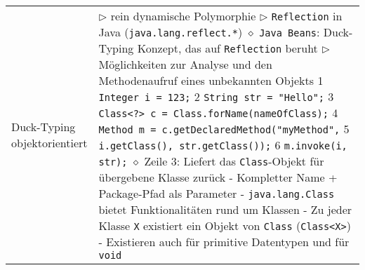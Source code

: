 \begin{longtable}{ | p{} p{} | }
	\makecell[l]{Duck-Typing \\ objektorientiert} & \makecell[l]{
	$\rhd$ rein dynamische Polymorphie \\
	$\rhd$ \texttt{Reflection} in Java (\texttt{java.lang.reflect.*}) \\
	\hspace{0.4cm} $\diamond$ \texttt{Java Beans}: Duck-Typing Konzept, das auf \texttt{Reflection} beruht \\
	$\rhd$ Möglichkeiten zur Analyse und den Methodenaufruf eines unbekannten Objekts \\
	\hspace{0.4cm} 1 \hspace{0.1cm} \texttt{Integer i = 123;} \\
	\hspace{0.4cm} 2 \hspace{0.1cm} \texttt{String str = "Hello";} \\
	\hspace{0.4cm} 3 \hspace{0.1cm} \texttt{Class<?> c = Class.forName(nameOfClass);} \\
	\hspace{0.4cm} 4 \hspace{0.1cm} \texttt{Method m = c.getDeclaredMethod("myMethod",} \\
	\hspace{0.4cm} 5 \hspace{2.5cm} \texttt{i.getClass(), str.getClass());} \\
	\hspace{0.4cm} 6 \hspace{0.1cm} \texttt{m.invoke(i, str);} \\
	\hspace{0.4cm} $\diamond$ Zeile 3: Liefert das \texttt{Class}-Objekt für übergebene Klasse zurück\\
	\hspace{0.6cm} - Kompletter Name + Package-Pfad als Parameter \\
	\hspace{0.6cm} - \texttt{java.lang.Class} bietet Funktionalitäten rund um Klassen \\
	\hspace{0.6cm} - Zu jeder Klasse \texttt{X} existiert ein Objekt von \texttt{Class} (\texttt{Class<X>}) \\
	\hspace{0.6cm} - Existieren auch für primitive Datentypen und für \texttt{void}\\
}
\end{longtable}
